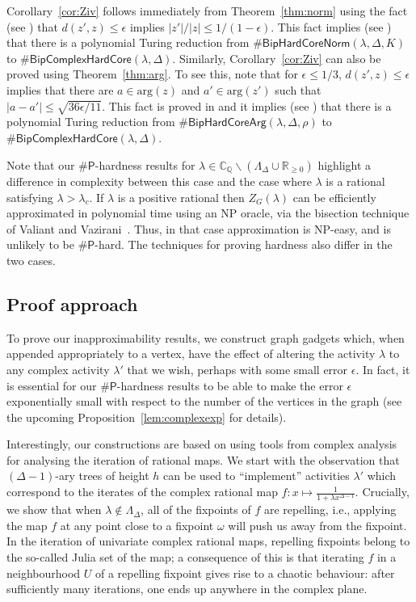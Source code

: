 \documentclass[11pt]{article}
\renewcommand\arg{\text{arg}}
\def\numP{\#\mathsf{P}}
\def\Reals{\mathbb{R}}
\def\CQ{\mathbb{C}_{\mathbb{Q}}}
\def\LambdaD{\Lambda_\Delta}
\def\FactorHardCore#1{\#\ensuremath{\mathsf{BipHardCoreNorm}(\lambda,\Delta,#1)}}
\def\ArgHardCore#1{\#\ensuremath{\mathsf{BipHardCoreArg}(\lambda,\Delta,#1)}}
\def\ComplexHardCore{\#\ensuremath{\mathsf{BipComplexHardCore}(\lambda,\Delta)}}
\begin{document}
Corollary~\ref{cor:Ziv} follows immediately from Theorem~\ref{thm:norm} using the fact (see \cite[Lemma 2.1]{ComplexIsing})
that $d(z',z) \leq \epsilon$ implies $|z'|/|z| \leq 1/(1-\epsilon)$.
This fact implies 
(see \cite[Lemma 2.2]{ComplexIsing})
that there is 
 a polynomial Turing reduction from  
$\FactorHardCore{K}$  to $\ComplexHardCore$.
Similarly,
Corollary~\ref{cor:Ziv} can also be proved using Theorem~\ref{thm:arg}.
To see this, note  that
for $\epsilon \leq 1/3$, $d(z',z) \leq \epsilon$ implies 
that there are 
$a\in \arg(z)$ and $a'\in \arg(z')$ such that
$| a-a'|\leq \sqrt{36\epsilon/11}$. This fact is proved in \cite[Lemma 2.1]{ComplexIsing}
 and it implies
 (see \cite[Lemma 2.2]{ComplexIsing})  that  there is a polynomial Turing reduction from   $\ArgHardCore{\rho}$ to $\ComplexHardCore$.

Note that our $\numP$-hardness results for $\lambda\in \CQ\backslash (\LambdaD\cup \Reals_{\geq 0})$  highlight a difference in complexity 
between this case and the case where $\lambda$ is a   rational satisfying $\lambda> \lambda_c$.
If $\lambda$ is a positive  rational then $Z_G(\lambda)$ can be efficiently approximated 
in polynomial time using an NP oracle, via the bisection technique of Valiant and Vazirani~\cite{VV}.
Thus, in that case approximation is NP-easy, and is unlikely to be $\numP$-hard. The techniques for proving hardness also differ in the two cases.

 

\subsection{Proof approach}
To prove our inapproximability results, we construct graph gadgets which, when  appended appropriately to a vertex, have the effect of altering the activity $\lambda$ to any complex activity $\lambda'$ that we wish, perhaps with some small error $\epsilon$. In fact, it is essential for our $\numP$-hardness results to be able to make the error $\epsilon$ exponentially small with respect to the number of the vertices in the graph  (see the upcoming Proposition~\ref{lem:complexexp} for details).



Interestingly,  our constructions are based on using tools from complex analysis for analysing the iteration of rational maps.   We start with the observation that $(\Delta-1)$-ary trees of height $h$  can be used to ``implement''  activities $\lambda'$ which correspond to the iterates of the  complex rational map $f:x\mapsto \frac{1}{1+\lambda x^{\Delta-1}}$. Crucially, we show that when $\lambda\notin \LambdaD$, all of the fixpoints of $f$ are repelling, i.e., applying the map $f$ at any point close to a fixpoint $\omega$ will push us away from the fixpoint. In the iteration of univariate complex rational maps, repelling fixpoints belong to the so-called Julia set of the map; a consequence of this is that iterating $f$ in a neighbourhood $U$ of a repelling fixpoint gives rise to a chaotic behaviour: after sufficiently many iterations, one ends up anywhere in the complex plane. 
\end{document}
